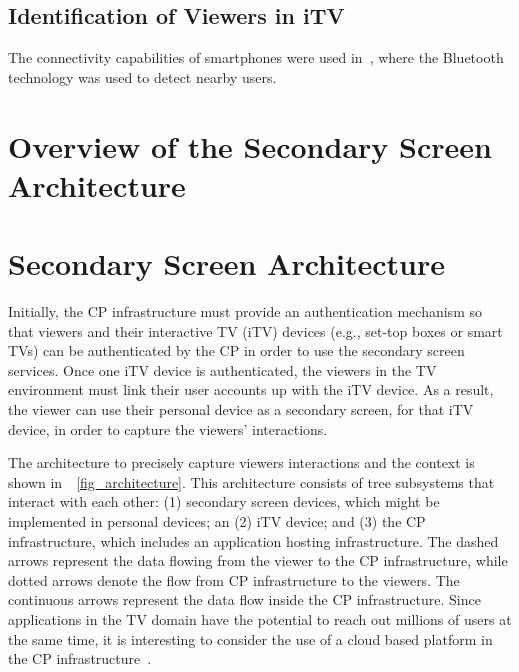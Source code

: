 \documentclass[journal]{IEEEtran}
\begin{document}
\subsection{Identification of Viewers in iTV}
\label{ssec_ident_viewers_itv}

The connectivity capabilities of smartphones were used in~\cite{Cabarcos2011}, where the Bluetooth technology was used to detect nearby users. 

\section{Overview of the Secondary Screen Architecture}

\section{Secondary Screen Architecture}

Initially, the CP infrastructure must provide an authentication mechanism so that viewers and their interactive TV (iTV) devices (e.g., set-top boxes or smart TVs) can be authenticated by the CP in order to use the secondary screen services. Once one iTV device is authenticated, the viewers in the TV environment must link their user accounts up with the iTV device. As a result, the viewer can use their personal device as a secondary screen, for that iTV device, in order to capture the viewers' interactions.

The architecture to precisely capture viewers interactions and the context is shown in~\figurename~\ref{fig_architecture}. This architecture consists of tree subsystems that interact with each other: (1) secondary screen devices, which might be implemented in personal devices; an (2) iTV device; and (3) the CP infrastructure, which includes an application hosting infrastructure. The dashed arrows represent the data flowing from the viewer to the CP infrastructure, while dotted arrows denote the flow from CP infrastructure to the viewers. The continuous arrows represent the data flow inside the CP infrastructure. Since applications in the TV domain have the potential to reach out millions of users at the same time, it is interesting to consider the use of a cloud based platform in the CP infrastructure~\cite{Lee2010}. 
\end{document}
